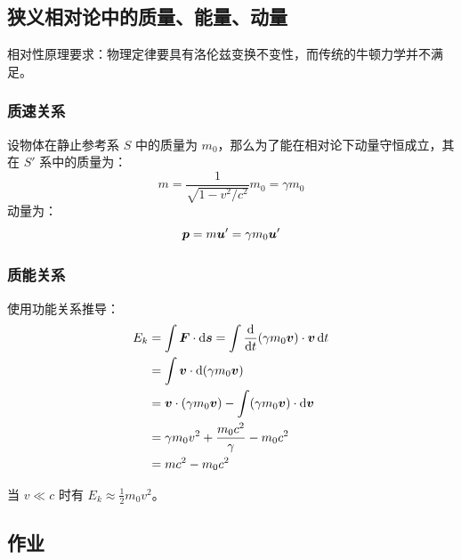 \subsection{狭义相对论中的质量、能量、动量}

相对性原理要求：物理定律要具有洛伦兹变换不变性，而传统的牛顿力学并不满足。

\subsubsection{质速关系}

设物体在静止参考系 $S$ 中的质量为 $m_0$，那么为了能在相对论下动量守恒成立，其在 $S'$ 系中的质量为：
$$
m = \frac{1}{\sqrt{1 - v^2 / c^2}} m_0 = \gamma m_0
$$
动量为：
$$
\boldsymbol{p} = m \boldsymbol{u}' = \gamma m_0 \boldsymbol{u}'
$$

\subsubsection{质能关系}

使用功能关系推导：
$$
\begin{aligned}
    E_k & = \int \boldsymbol{F} \cdot \dd{\boldsymbol{s}} = \int \dv{t}(\gamma m_0 \boldsymbol{v}) \cdot \boldsymbol{v} \dd{t} \\
    & = \int \boldsymbol{v} \cdot \dd(\gamma m_0 \boldsymbol{v}) \\
    & = \boldsymbol{v} \cdot (\gamma m_0 \boldsymbol{v}) - \int (\gamma m_0 \boldsymbol{v}) \cdot \dd{\boldsymbol{v}} \\
    & = \gamma m_0 v^2 + \frac{m_0 c^2}{\gamma} - m_0 c^2 \\
    & = m c^2 - m_0 c^2
\end{aligned}
$$

当 $v \ll c$ 时有 $E_k \approx \frac{1}{2} m_0 v^2$。

\subsection{作业}

